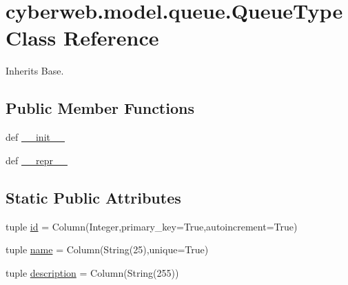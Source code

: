 \hypertarget{classcyberweb_1_1model_1_1queue_1_1_queue_type}{\section{cyberweb.\-model.\-queue.\-Queue\-Type \-Class \-Reference}
\label{classcyberweb_1_1model_1_1queue_1_1_queue_type}
}


\-Inherits \-Base.

\subsection*{\-Public \-Member \-Functions}
\begin{DoxyCompactItemize}
\item 
def \hyperlink{classcyberweb_1_1model_1_1queue_1_1_queue_type_a36fcc181730c1c0f015df0ac70ac50c7}{\-\_\-\-\_\-init\-\_\-\-\_\-}
\item 
def \hyperlink{classcyberweb_1_1model_1_1queue_1_1_queue_type_af5eab3696348554e12ad12a5fd0c9d74}{\-\_\-\-\_\-repr\-\_\-\-\_\-}
\end{DoxyCompactItemize}
\subsection*{\-Static \-Public \-Attributes}
\begin{DoxyCompactItemize}
\item 
tuple \hyperlink{classcyberweb_1_1model_1_1queue_1_1_queue_type_acf3df97b8efef8b230213f6b1db2d842}{id} = \-Column(\-Integer,primary\-\_\-key=\-True,autoincrement=\-True)
\item 
tuple \hyperlink{classcyberweb_1_1model_1_1queue_1_1_queue_type_a6fe6ad07d00c7930259e2babca68ff57}{name} = \-Column(\-String(25),unique=\-True)
\item 
tuple \hyperlink{classcyberweb_1_1model_1_1queue_1_1_queue_type_a916db2914c1ed0a16f6a050c7b39c11e}{description} = \-Column(\-String(255))
\end{DoxyCompactItemize}


